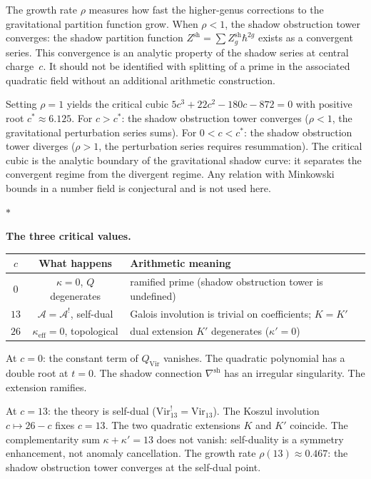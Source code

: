 \documentclass[11pt]{article}
\newcommand{\cA}{\mathcal{A}}
\newcommand{\sep}{\bigskip\begin{center}$*$\end{center}\medskip}
\begin{document}
The growth rate $\rho$ measures how fast the higher-genus
corrections to the gravitational partition function grow.
When $\rho < 1$, the shadow obstruction tower converges: the shadow
partition function $Z^{\mathrm{sh}} = \sum Z_g^{\mathrm{sh}}
\hbar^{2g}$ exists as a convergent series.  This convergence
is an analytic property of the shadow series at central
charge~$c$.  It should not be identified with splitting of a
prime in the associated quadratic field without an additional
arithmetic construction.

Setting $\rho = 1$ yields the critical cubic
$5c^3 + 22c^2 - 180c - 872 = 0$ with positive root
$c^* \approx 6.125$.  For $c > c^*$: the shadow obstruction tower
converges ($\rho < 1$, the gravitational perturbation
series sums).  For $0 < c < c^*$: the shadow obstruction tower diverges
($\rho > 1$, the perturbation series requires resummation).
The critical cubic is the analytic boundary of the gravitational
shadow curve: it separates the convergent regime from the
divergent regime.  Any relation with Minkowski bounds in a number
field is conjectural and is not used here.

\sep

\noindent\textbf{The three critical values.}\enspace
\begin{center}
\small
\renewcommand{\arraystretch}{1.15}
\begin{tabular}{@{}ccl@{}}
$c$ & \textbf{What happens} & \textbf{Arithmetic meaning} \\
\hline
$0$ & $\kappa = 0$, $Q$ degenerates & ramified prime
  (shadow obstruction tower is undefined) \\[3pt]
$13$ & $\cA = \cA^!$, self-dual
  & Galois involution is trivial on coefficients;
  $K = K'$ \\[3pt]
$26$ & $\kappa_{\mathrm{eff}} = 0$, topological & dual
  extension $K'$ degenerates ($\kappa' = 0$)
\end{tabular}
\end{center}

\medskip

At $c = 0$: the constant term of $Q_{\mathrm{Vir}}$ vanishes.
The quadratic polynomial has a double root at $t = 0$.  The
shadow connection $\nabla^{\mathrm{sh}}$ has an irregular
singularity.  The extension ramifies.

At $c = 13$: the theory is self-dual ($\mathrm{Vir}_{13}^!
= \mathrm{Vir}_{13}$).  The Koszul involution $c \mapsto 26-c$
fixes $c = 13$.  The two quadratic extensions $K$ and $K'$
coincide.  The complementarity sum $\kappa + \kappa' = 13$
does not vanish: self-duality is a symmetry enhancement, not
anomaly cancellation.  The growth rate $\rho(13) \approx 0.467$:
the shadow obstruction tower converges at the self-dual point.
\end{document}
